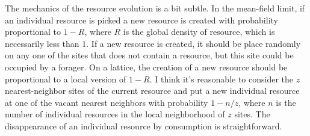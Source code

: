 \documentclass[11pt]{iopart}
\begin{document}
The mechanics of the resource evolution is a bit subtle.  In the mean-field
limit, if an individual resource is picked a new resource is created with
probability proportional to $1-R$, where $R$ is the global density of
resource, which is necessarily less than 1.  If a new resource is created, it
should be place randomly on any one of the sites that does not contain a
resource, but this site could be occupied by a forager.  On a lattice, the
creation of a new resource should be proportional to a local version of
$1-R$.  I think it's reasonable to consider the $z$ nearest-neighbor sites of
the current resource and put a new individual resource at one of the vacant
nearest neighbors with probability $1-{n}/{z}$, where $n$ is the number
of individual resources in the local neighborhood of $z$ sites.  The
disappearance of an individual resource by consumption is straightforward.
\end{document}
